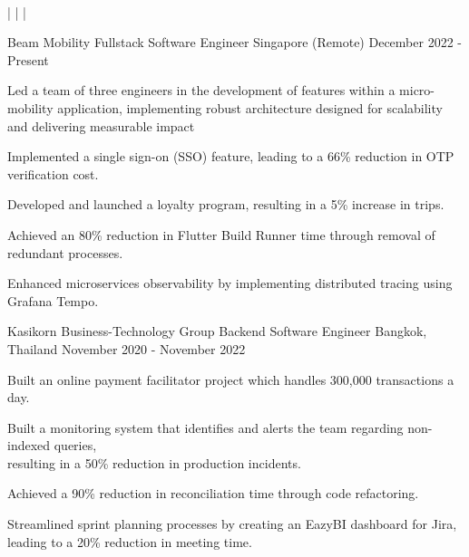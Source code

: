 \documentclass[]{awesome-cv}
\begin{document}
\begin{center}
	  \\
	\vspace{1mm}
	 |  |  | 
\end{center}
\begin{cventries}
	\cventry
	{Beam Mobility}
	{Fullstack Software Engineer}
	{Singapore (Remote)}
	{December 2022 - Present}
	{\begin{cvitems}
			\item {Led a team of three engineers in the development of features within a micro-mobility application, implementing robust architecture designed for scalability and delivering measurable impact}
			\item {Implemented a single sign-on (SSO) feature, leading to a 66\% reduction in OTP verification cost.}
			\item {Developed and launched a loyalty program, resulting in a 5\% increase in trips.}
			\item {Achieved an 80\% reduction in Flutter Build Runner time through removal of redundant processes.}
			\item {Enhanced microservices observability by implementing distributed tracing using Grafana Tempo.\\}
		\end{cvitems}}
	\cventry
	{Kasikorn Business-Technology Group}
	{Backend Software Engineer}
	{Bangkok, Thailand}
	{November 2020 - November 2022}
	{\begin{cvitems}
			\item {Built an online payment facilitator project which handles 300,000 transactions a day.}
			\item {Built a monitoring system that identifies and alerts the team regarding non-indexed queries,\\ resulting in a 50\% reduction in production incidents.}
			\item {Achieved a 90\% reduction in reconciliation time through code refactoring.}
			\item {Streamlined sprint planning processes by creating an EazyBI dashboard for Jira,\\ leading to a 20\% reduction in meeting time.}

\end{cvitems}}
\end{cventries}
\end{document}
